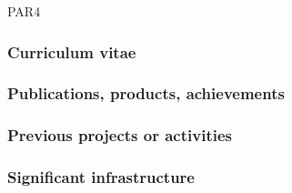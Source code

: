 \begin{sitedescription}{PAR4}

\subsubsection*{Curriculum vitae}





\subsubsection*{Publications, products, achievements}

\begin{compactenum}
\item {}
\end{compactenum}

\subsubsection*{Previous projects or activities}

\begin{compactenum}
\item {}
\end{compactenum}

\subsubsection*{Significant infrastructure}

\end{sitedescription}

